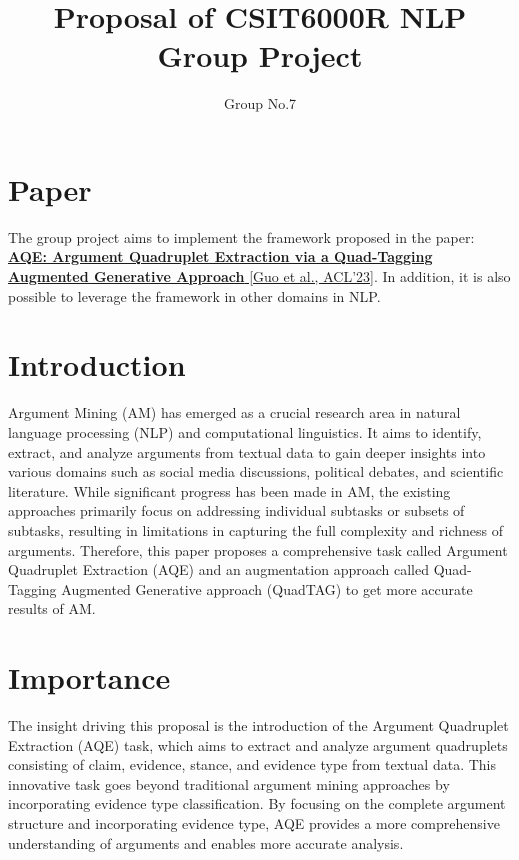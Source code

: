 \documentclass{article}
\title{Proposal of CSIT6000R NLP Group Project}
\author{
    Group No.7
}
\date{}
\begin{document}
\maketitle

\section{Paper}

\noindent

The group project aims to implement the framework proposed in the paper: \href{https://aclanthology.org/2023.findings-acl.59/}{\textbf{AQE: Argument Quadruplet Extraction via a Quad-Tagging Augmented Generative Approach} [Guo et al., ACL’23]}. In addition, it is also possible to leverage the framework in other domains in NLP.

\section{Introduction}

\noindent

Argument Mining (AM) has emerged as a crucial research area in natural language processing (NLP) and computational linguistics. It aims to identify, extract, and analyze arguments from textual data to gain deeper insights into various domains such as social media discussions, political debates, and scientific literature. While significant progress has been made in AM, the existing approaches primarily focus on addressing individual subtasks or subsets of subtasks, resulting in limitations in capturing the full complexity and richness of arguments. Therefore, this paper proposes a comprehensive task called Argument Quadruplet Extraction (AQE) and an augmentation approach called Quad-Tagging Augmented Generative approach (QuadTAG) to get more accurate results of AM.

\section{Importance}

\noindent

The insight driving this proposal is the introduction of the Argument Quadruplet Extraction (AQE) task, which aims to extract and analyze argument quadruplets consisting of claim, evidence, stance, and evidence type from textual data. This innovative task goes beyond traditional argument mining approaches by incorporating evidence type classification. By focusing on the complete argument structure and incorporating evidence type, AQE provides a more comprehensive understanding of arguments and enables more accurate analysis.
\end{document}
